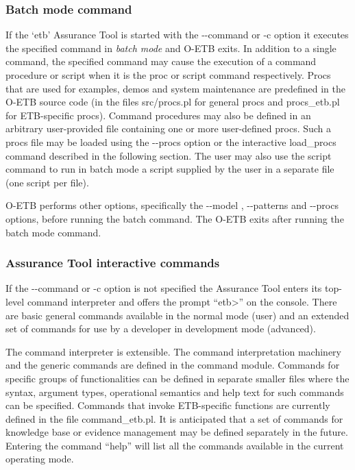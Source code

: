 \documentclass[12pt,twoside,a4paper]{article}
\begin{document}
\hypertarget{batch-mode-command}{%
\subsubsection{Batch mode command}\label{batch-mode-command}}

If the `etb' Assurance Tool is started with the -\/-command or -c option it executes the specified command in \emph{batch mode} and O-ETB exits. In addition to a single command, the specified command may cause the execution of a command procedure or script when it is the proc or script command respectively. Procs that are used for examples, demos and system maintenance are predefined in the O-ETB source code (in the files src/procs.pl for general procs and procs\_etb.pl for ETB-specific procs). Command procedures may also be defined in an arbitrary user-provided file containing one or more user-defined procs. Such a procs file may be loaded using the -\/-procs option or the interactive load\_procs command described in the following section. The user may also use the script command to run in batch mode a script supplied by the user in a separate file (one script per file).

O-ETB performs other options, specifically the -\/-model , -\/-patterns and -\/-procs options, before running the batch command. The O-ETB exits after running the batch mode command.

\hypertarget{assurance-tool-interactive-commands}{%
\subsubsection{Assurance Tool interactive commands}\label{assurance-tool-interactive-commands}}

If the -\/-command or -c option is not specified the Assurance Tool enters its top-level command interpreter and offers the prompt ``etb\textgreater'' on the console. There are basic general commands available in the normal mode (user) and an extended set of commands for use by a developer in development mode (advanced).

The command interpreter is extensible. The command interpretation machinery and the generic commands are defined in the command module. Commands for specific groups of functionalities can be defined in separate smaller files where the syntax, argument types, operational semantics and help text for such commands can be specified. Commands that invoke ETB-specific functions are currently defined in the file command\_etb.pl. It is anticipated that a set of commands for knowledge base or evidence management may be defined separately in the future. Entering the command ``help'' will list all the commands available in the current operating mode.
\end{document}
